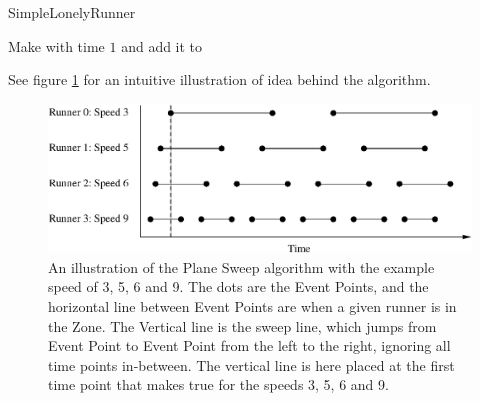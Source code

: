 \begin{algorithm}[H]
  \caption{SimpleLonelyRunner}
  \highlights
  
  Make \finish with time $1$ and add it to \li

  
\end{algorithm}

See figure \ref{algoIlluImg} for an intuitive illustration of idea behind the algorithm. 

\begin{figure}[H]
  \centering
  \includegraphics[width=\textwidth]{./images/algoIlluEPS}
  \caption{\label{algoIlluImg}An illustration of the Plane Sweep algorithm with the example speed of 3, 5, 6 and 9. The dots are the Event Points, and the horizontal line between Event Points are when a given runner is in the Zone. The Vertical line is the sweep line, which jumps from Event Point to Event Point from the left to the right, ignoring all time points in-between. The vertical line is here placed at the first time point that makes  true for the speeds 3, 5, 6 and 9.}
\end{figure}

